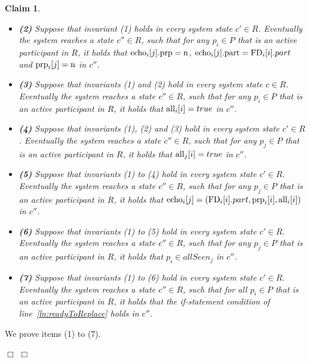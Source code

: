 \documentclass[11pt]{article}
\newcommand{\notif}{prp}
\newtheorem{claim}[theorem]{Claim}
\newenvironment{proof}{\noindent{\bf Proof.}}{\hfill$\Box$}
\begin{document}
\begin{proof}
\begin{claim}
\begin{itemize}[topsep=2pt,itemsep=-.5ex,partopsep=.5ex,parsep=1ex,leftmargin=2mm]
\item[]{\bf (2)} Suppose that invariant (1) holds in  every system state $c' \in R$. Eventually the system reaches a state $c'' \in R$, such that for any $p_i \in P$ that is an active participant in $R$, it holds that $\textnormal{echo}_i[j].\textnormal{\notif} = \textnormal{n}$, $\textnormal{echo}_i[j].\textnormal{part} = \textnormal{FD}_i[i].part$ and $\textnormal{\notif}_i[j]=\textnormal{n}$  in $c''$.

\item[]{\bf (3)} Suppose that invariants (1) and (2) hold in every system state $c \in R$. Eventually the system reaches a state $c'' \in R$, such that for any $p_i \in P$ that is an active participant in $R$, it holds that $\textnormal{all}_i[i] = true$  in $c''$.

\item[]{\bf (4)} Suppose that invariants (1), (2) and (3) hold in every system state $c' \in R$. Eventually the system reaches a state $c'' \in R$, such that for any $p_j \in P$ that is an active participant in $R$, it holds that $\textnormal{all}_j[i] = true$  in $c''$. 

\item[]{\bf (5)} Suppose that invariants (1) to (4) hold in every system state $c' \in R$. Eventually the system reaches a state $c'' \in R$, such that for any $p_j \in P$ that is an active participant in $R$, it holds that $\textnormal{echo}_i[j] = (\textnormal{FD}_i[i].part, \textnormal{\notif}_i[i], \textnormal{all}_i[i])$ in $c''$. 

\item[]{\bf (6)} Suppose that invariants (1) to (5) hold in every system state $c' \in R$. Eventually the system reaches a state $c'' \in R$, such that for any $p_j \in P$ that is an active participant in $R$, it holds that $p_i \in allSeen_j$  in $c''$. 






\item[]{\bf (7)} Suppose that invariants (1) to (6) hold in every system state $c' \in R$. Eventually the system reaches a state $c'' \in R$, such that for all $p_i \in P$ that is an active participant in $R$, it holds that the if-statement condition of line~\ref{ln:readyToReplace} holds in $c''$.
\end{itemize}
\end{claim}
\begin{proof} We prove items (1) to (7). 
	

\end{proof}
\end{proof}
\end{document}
